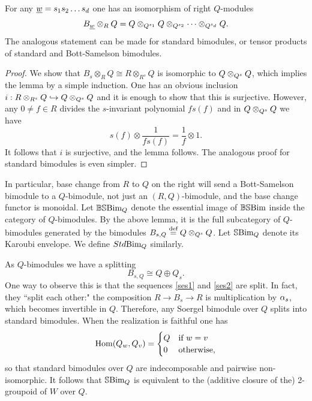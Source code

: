 \begin{lem}\label{localizationononeside} For any $\underline{w} = s_1s_2 \dots s_d$ one has an isomorphism of right $Q$-modules
\[
B_{\underline{w}} \otimes_R Q = Q \otimes_{Q^{s_1}} Q \otimes_{Q^{s_2}}  \dots \otimes_{Q^{s_d}} Q.
\]
The analogous statement can be made for standard bimodules, or tensor products of standard and Bott-Samelson bimodules.
\end{lem}

\begin{proof} We show that $B_s \otimes_R Q \cong R \otimes_{R^s} Q$ is isomorphic to $Q \otimes_{Q^s} Q$, which implies the lemma by a simple induction. One has an obvious inclusion $i : R \otimes_{R^s} Q \hookrightarrow Q \otimes_{Q^s} Q$ and it is enough to show that this is surjective. However, any $0 \ne f \in R$ divides the $s$-invariant polynomial $fs(f)$ and in $Q \otimes_{Q^s} Q$ we have
\[
s(f) \otimes \frac{1}{fs(f)} = \frac{1}{f} \otimes 1.
\]
It follows that $i$ is surjective, and the lemma follows. The analogous proof for standard bimodules is even simpler. \end{proof}

In particular, base change from $R$ to $Q$ on the right will send a Bott-Samelson bimodule to a $Q$-bimodule, not just an $(R,Q)$-bimodule, and the base change functor is monoidal. Let
$\mathbb{BS}\textrm{Bim}_Q$ denote the essential image of $\mathbb{BS}\textrm{Bim}$ inside the category of $Q$-bimodules. By the above lemma, it is the full subcategory of $Q$-bimodules generated by the bimodules
$B_{s,Q}\stackrel{\mbox{\scriptsize{def}}}{=} Q \otimes_{Q^s} Q$. Let $\mathbb{S}\textrm{Bim}_Q$ denote its Karoubi envelope. We define $Std\textrm{Bim}_Q$ similarly.

As $Q$-bimodules we have a splitting \begin{equation} \label{eq:split} B_{s,Q} \cong Q \oplus Q_s. \end{equation} One way to observe this is that the sequences \eqref{ses1} and
\eqref{ses2} are split. In fact, they ``split each other:" the composition $R \to B_s \to R$ is multiplication by $\alpha_s$, which becomes invertible in $Q$. Therefore, any Soergel bimodule
over $Q$ splits into standard bimodules. When the realization is faithful one has \[ \operatorname{Hom}(Q_w,Q_v) = \begin{cases} Q & \text{if $w = v$} \\ 0 & \text{otherwise,} \end{cases} \] so that
standard bimodules over $Q$ are indecomposable and pairwise non-isomorphic. It follows that $\mathbb{S}\textrm{Bim}_Q$ is equivalent to the (additive closure of the) 2-groupoid of $W$ over $Q$.


